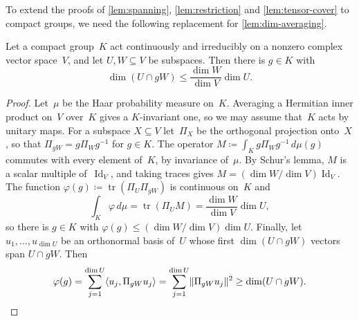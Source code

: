 \documentclass[11pt,letterpaper]{article}
\DeclareMathOperator{\Id}{Id}
\begin{document}
To extend the proofs of \cref{lem:spanning}, \cref{lem:restriction} and \cref{lem:tensor-cover} to compact groups, we need the following replacement for \cref{lem:dim-averaging}.

\begin{lemma}\label{lem:dim-averaging-compact}
Let a compact group~$K$ act continuously and irreducibly on a nonzero complex vector space~$V$, and let $U, W \subseteq V$ be subspaces. Then there is $g \in K$ with
\[
\dim(U \cap gW) \leq \frac{\dim W}{\dim V} \dim U.
\]
\end{lemma}
\begin{proof}
Let~$\mu$ be the Haar probability measure on~$K$. Averaging a Hermitian inner product on~$V$ over~$K$ gives a $K$-invariant one, so we may assume that~$K$ acts by unitary maps. For a subspace $X \subseteq V$ let~$\Pi_X$ be the orthogonal projection onto~$X$, so that $\Pi_{gW} = g \Pi_W g^{-1}$ for $g \in K$. The operator $M \coloneqq \int_K g \Pi_W g^{-1} \, d\mu(g)$ commutes with every element of~$K$, by invariance of~$\mu$. By Schur's lemma, $M$ is a scalar multiple of~$\Id_V$, and taking traces gives $M = (\dim W / \dim V) \Id_V$. The function $\varphi(g) \coloneqq \operatorname{tr}(\Pi_U \Pi_{gW})$ is continuous on~$K$ and
\[
\int_K \varphi \, d\mu = \operatorname{tr}(\Pi_U M) = \frac{\dim W}{\dim V} \dim U,
\]
so there is $g \in K$ with $\varphi(g) \leq (\dim W/\dim V) \dim U$. Finally, let $u_1, \ldots, u_{\dim U}$ be an orthonormal basis of~$U$ whose first $\dim(U \cap gW)$ vectors span $U \cap gW$. Then
\[
\varphi(g) = \sum_{j=1}^{\dim U} \langle u_j, \Pi_{gW} u_j \rangle = \sum_{j=1}^{\dim U} \lVert \Pi_{gW} u_j \rVert^2 \geq \dim(U \cap gW). \qedhere
\]
\end{proof}
\end{document}

